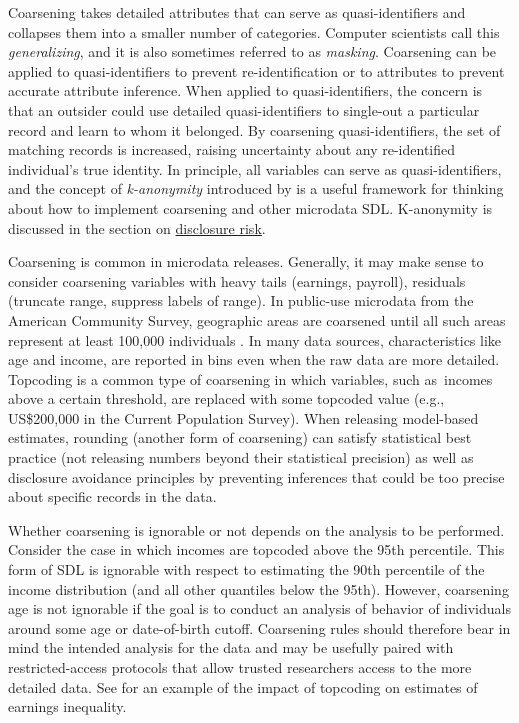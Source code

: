 Coarsening takes detailed attributes that can serve as quasi-identifiers and collapses them into a smaller number of categories. Computer scientists call this \emph{generalizing}, and it is also sometimes referred to as \emph{masking}. Coarsening can be applied to quasi-identifiers to prevent re-identification or to attributes to prevent accurate attribute inference. When applied to quasi-identifiers, the concern is that an outsider could use detailed quasi-identifiers to single-out a particular record and learn to whom it belonged. By coarsening quasi-identifiers, the set of matching records is increased, raising uncertainty about any re-identified individual's true identity. In principle, all variables can serve as quasi-identifiers, and the concept of \emph{k-anonymity} introduced by \citet{sweeney_achieving_2002} is a useful framework for thinking about how to implement coarsening and other microdata SDL. K-anonymity is discussed in the section on \protect\hyperlink{disclosure-risk}{disclosure risk}.

Coarsening is common in microdata releases. Generally, it may make sense to consider coarsening variables with heavy tails (earnings, payroll), residuals (truncate range, suppress labels of range). In public-use microdata from the American Community Survey, geographic areas are coarsened until all such areas represent at least 100,000 individuals \citep{us_census_bureau_finalpublic_2011}. In many data sources, characteristics like age and income, are reported in bins even when the raw data are more detailed. Topcoding is a common type of coarsening in which variables, such as~incomes above a certain threshold, are replaced with some topcoded value (e.g., US\$200,000 in the Current Population Survey). When releasing model-based estimates, rounding (another form of coarsening) can satisfy statistical best practice (not releasing numbers beyond their statistical precision) as well as disclosure avoidance principles by preventing inferences that could be too precise about specific records in the data.

Whether coarsening is ignorable or not depends on the analysis to be performed. Consider the case in which incomes are topcoded above the 95th percentile. This form of SDL is ignorable with respect to estimating the 90th percentile of the income distribution (and all other quantiles below the 95th). However, coarsening age is not ignorable if the goal is to conduct an analysis of behavior of individuals around some age or date-of-birth cutoff. Coarsening rules should therefore bear in mind the intended analysis for the data and may be usefully paired with restricted-access protocols that allow trusted researchers access to the more detailed data. See \citet{burkhauser_estimating_2011} for an example of the impact of topcoding on estimates of earnings inequality.

